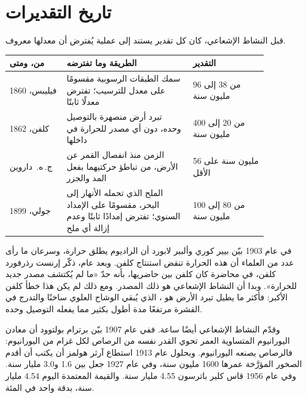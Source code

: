 \section{تاريخ التقديرات}

قبل النشاط الإشعاعي، كان كل تقدير  يستند إلى عملية
يُفترض أن معدلها معروف.

\begin{center}
\small
\begin{tabular}{|p{0.19\linewidth}|p{0.42\linewidth}|p{0.25\linewidth}|}
\hline
من، ومتى & الطريقة وما تفترضه & التقدير \\
\hline
فيليبس، 1860 & سمك الطبقات الرسوبية مقسومًا على معدل للترسيب؛ تفترض معدلًا ثابتًا & من 38 إلى 96 مليون سنة \\
كلفن، 1862 & تبرد أرض منصهرة بالتوصيل وحده، دون أي مصدر للحرارة في داخلها & من 20 إلى 400 مليون سنة \\
ج.\,ه.~داروين & الزمن منذ انفصال القمر عن الأرض، من تباطؤ حركتيهما بفعل المد والجزر & 56 مليون سنة على الأقل \\
جولي، 1899 & الملح الذي تحمله الأنهار إلى البحر، مقسومًا على الإمداد السنوي؛ تفترض إمدادًا ثابتًا وعدم إزالة أي ملح & من 80 إلى 100 مليون سنة \\
\hline
\end{tabular}
\end{center}

\begin{history}
في عام 1903 بيّن بيير كوري وألبير لابورد أن الراديوم يطلق حرارة،
وسرعان ما رأى عدد من العلماء أن هذه الحرارة تنقض استنتاج
كلفن. وبعد عام، ذكّر إرنست رذرفورد كلفن، في محاضرة كان كلفن بين
حاضريها، بأنه حدّ 
«ما لم يُكتشف مصدر جديد للحرارة». وبدا أن النشاط الإشعاعي هو
ذلك المصدر. ومع ذلك لم يكن هذا خطأ كلفن الأكبر: فأكثر ما يطيل تبرد الأرض
هو ، الذي يُبقي الوشاح العلوي ساخنًا والتدرج في
القشرة مرتفعًا مدة أطول بكثير مما يفعله التوصيل وحده.
\end{history}

وقدّم النشاط الإشعاعي أيضًا ساعة. ففي عام 1907 بيّن برترام بولتوود أن
معادن اليورانيوم المتساوية العمر تحوي القدر نفسه من الرصاص لكل غرام
من اليورانيوم: فالرصاص يصنعه اليورانيوم. وبحلول عام 1913 استطاع آرثر هولمز أن
يكتب أن أقدم الصخور المؤرَّخة عمرها \num{1600} مليون سنة، وفي
عام 1927 جعل  بين 1.6 و3.0 مليار سنة. وفي عام 1956 قاس كلير
باترسون 4.55 مليار سنة. والقيمة المعتمدة اليوم 4.54 مليار سنة،
بدقة واحد في المئة.


